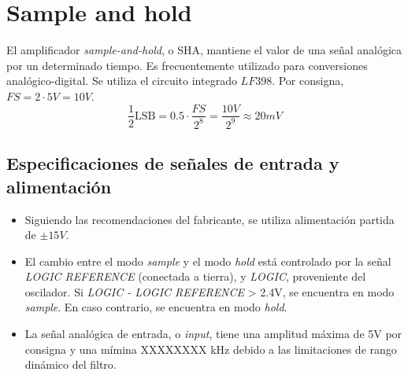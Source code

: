 \documentclass[../../ASSD_TP1_G7.tex]{subfiles}
\begin{document}
	
	
	
	


\chapter*{Sample and hold}
El amplificador \textit{sample-and-hold}, o SHA, mantiene el valor de una se\~nal anal\'ogica por un determinado tiempo. Es frecuentemente utilizado para conversiones anal\'ogico-digital. Se utiliza el circuito integrado $LF398$. Por consigna, $FS = 2\cdot 5V = 10V$.
\[\frac{1}{2}\text{LSB} = 0.5\cdot \frac{FS}{2^8} = \frac{10V}{2^9} \approx 20mV\]


\section{Especificaciones de se\~nales de entrada y alimentaci\'on}
\begin{itemize}
	\item Siguiendo las recomendaciones del fabricante, se utiliza alimentaci\'on partida de $\pm 15V$.
	\item El cambio entre el modo \textit{sample} y el modo \textit{hold} est\'a controlado por la se\~nal \textit{LOGIC REFERENCE} (conectada a tierra), y \textit{LOGIC}, proveniente del oscilador.  Si \textit{LOGIC - LOGIC REFERENCE} > 2.4V, se encuentra en modo \textit{sample}. En caso contrario, se encuentra en modo \textit{hold}.
	\item La se\~nal anal\'ogica de entrada, o \textit{input}, tiene una amplitud m\'axima de 5V por consigna y una m\'imina XXXXXXXX kHz debido a las limitaciones de rango din\'amico del filtro. 
\end{itemize}
\end{document}
